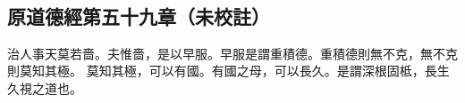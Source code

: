 ﻿%
%

\chapter{~}

\section{原道德經第五十九章（未校註）}

\begin{withgezhu}

\zhsong


治人事天莫若嗇。夫惟嗇，是以早服。早服是謂重積德。重積德則無不克，無不克則莫知其極。
莫知其極，可以有國。有國之母，可以長久。是謂深根固柢，長生久視之道也。

\end{withgezhu}
